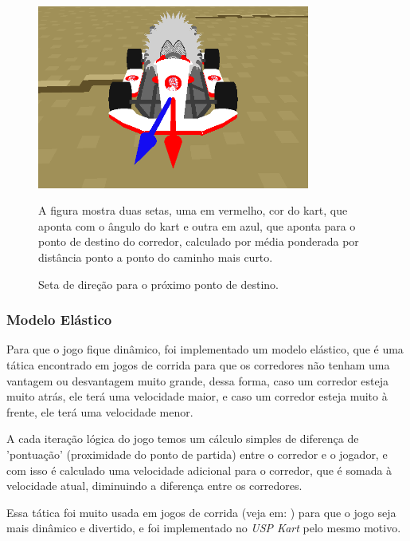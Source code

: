 \begin{figure}[H]
    \centering
    \includegraphics[width=0.8\textwidth]{figuras/direção.png}
    \caption{Seta de direção para o próximo ponto de destino.}
    \footnotesize{A figura mostra duas setas, uma em vermelho, cor do kart, que aponta com o ângulo do kart e outra em azul, que aponta para o ponto de destino do corredor, calculado por média ponderada por distância ponto a ponto do caminho mais curto.}
    \label{fig:arrow}
\end{figure}

\subsubsection{Modelo Elástico}

Para que o jogo fique dinâmico, foi implementado um modelo elástico, que é uma tática encontrado em jogos de corrida para que os corredores não tenham uma vantagem ou desvantagem muito grande, dessa forma, caso um corredor esteja muito atrás, ele terá uma velocidade maior, e caso um corredor esteja muito à frente, ele terá uma velocidade menor.

A cada iteração lógica do jogo temos um cálculo simples de diferença de 'pontuação' (proximidade do ponto de partida) entre o corredor e o jogador, e com isso é calculado uma velocidade adicional para o corredor, que é somada à velocidade atual, diminuindo a diferença entre os corredores.

Essa tática foi muito usada em jogos de corrida (veja em: \cite{rubberBandAi}) para que o jogo seja mais dinâmico e divertido, e foi implementado no \textit{USP Kart} pelo mesmo motivo.